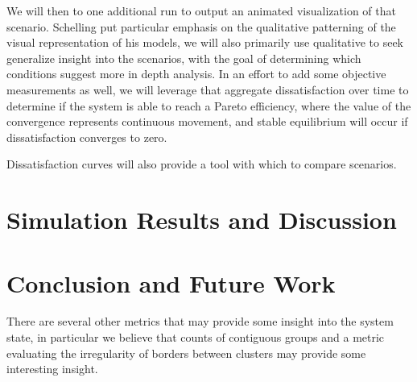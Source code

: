 \documentclass[sigplan,nonacm]{acmart}
\begin{document}
We will then to one additional run to output an animated visualization of that scenario.
Schelling put particular emphasis on the qualitative patterning of the visual representation of his models,
we will also primarily use qualitative to seek generalize insight into the scenarios, with the goal of 
determining which conditions suggest more in depth analysis.
In an effort to add some objective measurements as well, we will leverage that aggregate dissatisfaction over time
to determine if the system is able to reach a Pareto efficiency, where the value of the convergence represents
continuous movement, and stable equilibrium will occur if dissatisfaction converges to zero.

Dissatisfaction curves will also provide a tool with which to compare scenarios.

\section{Simulation Results and Discussion}




\section{Conclusion and Future Work}



There are several other metrics that may provide some insight into the system state, in particular we believe that 
counts of contiguous groups and a metric evaluating the irregularity of borders between clusters may provide some interesting insight.



\end{document}
